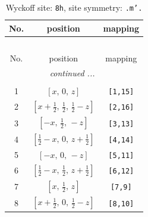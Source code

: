 \documentclass[fleqn,8pt]{jsarticle}
\begin{document}
\begin{longtable}{ccc}
\caption{Wyckoff site: {\tt 8h}, site symmetry: {\tt .m'.}}
 \\
 \hline \hline
No. & position & mapping \\ \hline \endfirsthead

\multicolumn{2}{l}{\tablename\ \thetable{}} \\
 \hline \hline
No. & position & mapping \\ \hline \endhead

 \hline \hline
\multicolumn{2}{r}{\footnotesize\it continued ...} \\ \endfoot

 \hline \hline
\multicolumn{2}{r}{} \\ \endlastfoot

1 & $\left[ x,\, 0,\, z \right]$ & {\tt [1,15]} \\ \hline
2 & $\left[ x + \frac{1}{2},\, \frac{1}{2},\, \frac{1}{2} - z \right]$ & {\tt [2,16]} \\ \hline
3 & $\left[ - x,\, \frac{1}{2},\, - z \right]$ & {\tt [3,13]} \\ \hline
4 & $\left[ \frac{1}{2} - x,\, 0,\, z + \frac{1}{2} \right]$ & {\tt [4,14]} \\ \hline
5 & $\left[ - x,\, 0,\, - z \right]$ & {\tt [5,11]} \\ \hline
6 & $\left[ \frac{1}{2} - x,\, \frac{1}{2},\, z + \frac{1}{2} \right]$ & {\tt [6,12]} \\ \hline
7 & $\left[ x,\, \frac{1}{2},\, z \right]$ & {\tt [7,9]} \\ \hline
8 & $\left[ x + \frac{1}{2},\, 0,\, \frac{1}{2} - z \right]$ & {\tt [8,10]} \\
\end{longtable}
\renewcommand{\arraystretch}{1.2}
\end{document}
